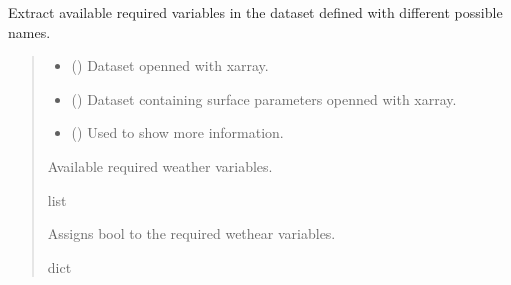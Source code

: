 \documentclass[a4paper,11pt,english]{sphinxmanual}
\begin{document}
\begin{fulllineitems}
\label{\detokenize{modules:envlib.extract_data.extract_data_variables}}
\pysigstartsignatures
{}
\pysigstopsignatures
\sphinxAtStartPar
Extract available required variables in the dataset defined with different possible names.
\begin{quote}\begin{description}
\begin{itemize}
\item {} 
\sphinxAtStartPar
{} () \textendash{} Dataset openned with xarray.

\item {} 
\sphinxAtStartPar
{} () \textendash{} Dataset containing surface parameters openned with xarray.

\item {} 
\sphinxAtStartPar
{} () \textendash{} Used to show more information.

\end{itemize}

\sphinxAtStartPar
Available required weather variables.

\sphinxAtStartPar
list

\sphinxAtStartPar
Assigns bool to the required wethear variables.

\sphinxAtStartPar
dict

\end{description}\end{quote}

\end{fulllineitems}

\end{document}
